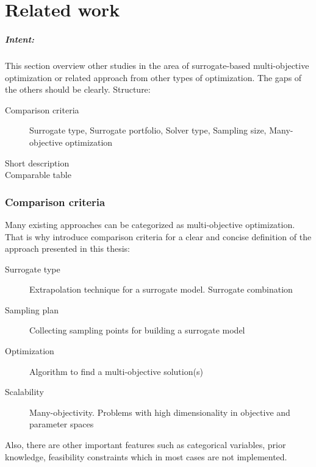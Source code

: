 \chapter{Related work}\label{sec:related}

    \begin{blockquote}
        \paragraph{Intent:} This section overview other studies in the area of surrogate-based multi-objective optimization or related approach from other types of optimization. The gaps of the others should be clearly. 
        Structure:
        \begin{description}
            \item[Comparison criteria] Surrogate type, Surrogate portfolio, Solver type, Sampling size, Many-objective optimization
            \item[Short description] 
            \item[Comparable table] 
        \end{description}
    \end{blockquote}


    \subsection{Comparison criteria}
        Many existing approaches can be categorized as multi-objective optimization. That is why introduce comparison criteria for a clear and concise definition of the approach presented in this thesis:
        \begin{description}
            \item[Surrogate type] Extrapolation technique for a surrogate model. Surrogate combination
            \item[Sampling plan] Collecting sampling points for building a surrogate model
            \item[Optimization] Algorithm to find a multi-objective solution(s)
            \item[Scalability] Many-objectivity. Problems with high dimensionality in objective and parameter spaces                
        \end{description}
        Also, there are other important features such as categorical variables, prior knowledge, feasibility constraints which in most cases are not implemented.
        
